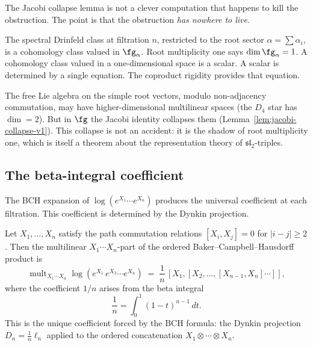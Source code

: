\begin{remark}
The Jacobi collapse lemma is not a clever computation that
happens to kill the obstruction. The point is that the obstruction
\emph{has nowhere to live}.

The spectral Drinfeld class at filtration $n$, restricted to the root
sector $\alpha=\sum\alpha_i$, is a cohomology class valued in
$\fg_\alpha$. Root multiplicity one says
$\dim\fg_\alpha=1$. A cohomology class valued in a one-dimensional
space is a scalar. A scalar is determined by a single equation.
The coproduct rigidity provides that equation.

The free Lie algebra on the simple root vectors, modulo non-adjacency
commutation, may have higher-dimensional multilinear spaces (the $D_4$
star has $\dim=2$). But in $\fg$ the Jacobi identity collapses them
(Lemma~\ref{lem:jacobi-collapse-v1}). This collapse is not an accident:
it is the shadow of root multiplicity one, which is itself a theorem
about the representation theory of $\mathfrak{sl}_2$-triples.
\end{remark}

\subsection{The beta-integral coefficient}

The BCH expansion of $\log(e^{X_1}\cdots e^{X_n})$ produces the
universal coefficient at each filtration. This coefficient is
determined by the Dynkin projection.

\begin{theorem}
\label{thm:dynkin-beta-integral}
Let $X_1,\ldots,X_n$ satisfy the path commutation relations
$[X_i,X_j]=0$ for $|i-j|\ge 2$. Then the multilinear
$X_1\cdots X_n$-part of the ordered Baker--Campbell--Hausdorff product is
\[
\operatorname{mult}_{X_1\cdots X_n}
\log(e^{X_1}\,e^{X_2}\cdots e^{X_n})
\;=\;
\frac{1}{n}\,[X_1,[X_2,\ldots,[X_{n-1},X_n]\cdots]],
\]
where the coefficient $1/n$ arises from the beta integral
\begin{equation}\label{eq:beta-integral-coeff}
\frac{1}{n}=\int_0^1(1-t)^{n-1}\,dt.
\end{equation}
This is the unique coefficient forced by the BCH formula: the Dynkin
projection $D_n=\frac{1}{n}\ell_n$ applied to the ordered
concatenation $X_1\otimes\cdots\otimes X_n$.
\end{theorem}

